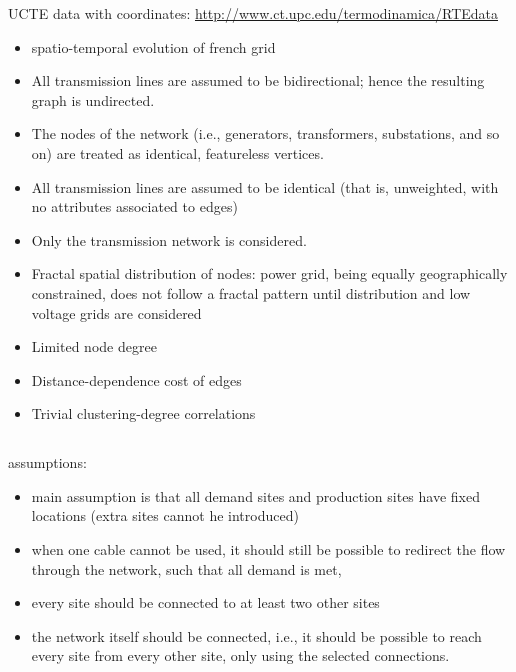\documentclass[paper=a4, fontsize=12pt]{article}
\begin{document}
UCTE data with coordinates:
\url{http://www.ct.upc.edu/termodinamica/RTEdata}

\begin{itemize}
\item spatio-temporal evolution of french grid

\item All transmission lines are assumed to be bidirectional; hence the resulting graph is undirected.
\item The nodes of the network (i.e., generators, transformers, substations, and so on) are treated as identical, featureless vertices.
\item All transmission lines are assumed to be identical (that is, unweighted, with no attributes associated to edges)
\item Only the transmission network is considered.

\item Fractal spatial distribution of nodes: power grid, being equally geographically constrained, does not follow a fractal pattern until distribution and low voltage grids are considered
\item Limited node degree
\item Distance-dependence cost of edges 
\item Trivial clustering-degree correlations
\end{itemize}

\subsection*{\citeauthor{Ravn1996} \cite{Ravn1996}}

assumptions:
\begin{itemize}
\item main assumption is that all demand sites and production sites have fixed locations (extra sites cannot he introduced)
\item when one cable cannot be used, it should still be possible to redirect the flow through the network, such that all demand is met,
\item every site should be connected to at least two other sites
\item the network itself should be connected, i.e., it should be possible to reach every site from every other site, only using the selected connections.
\end{itemize}
\end{document}
